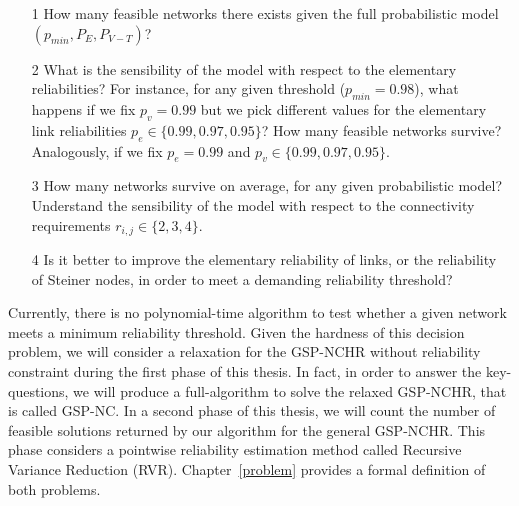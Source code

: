 \begin{enumerate}
\item[1] How many feasible networks there exists given the full probabilistic model $(p_{min},P_E,P_{V-T})$? 
\item[2] What is the sensibility of the model with respect to the elementary reliabilities? 
For instance, for any given threshold ($p_{min}=0.98$), what happens if we fix 
$p_v=0.99$ but we pick different values for the elementary link reliabilities 
$p_e \in \{0.99,0.97,0.95\}$? How many feasible networks survive? Analogously, if we 
fix $p_e=0.99$ and $p_v \in \{0.99, 0.97, 0.95\}$. 
\item[3] How many networks survive on average, for any given probabilistic model? 
Understand the sensibility of the model with respect to the connectivity requirements 
$r_{i,j} \in \{2,3,4\}$. 
\item[4] Is it better to  improve the elementary reliability of links, or the reliability of Steiner nodes, in order to meet a demanding reliability threshold? 
\end{enumerate}

Currently, there is no polynomial-time algorithm to test whether a given network meets a minimum reliability threshold. 
Given the hardness of this decision problem, we will consider a relaxation for the GSP-NCHR without reliability constraint 
during the first phase of this thesis. In fact, in order to answer the key-questions, we will produce a full-algorithm 
to solve the relaxed GSP-NCHR, that is called GSP-NC. In a second phase of this thesis, we will count the number of feasible solutions returned by our algorithm for the general GSP-NCHR. This phase considers a pointwise reliability estimation method called Recursive Variance Reduction (RVR). Chapter~\ref{problem} provides a formal definition of both problems. 